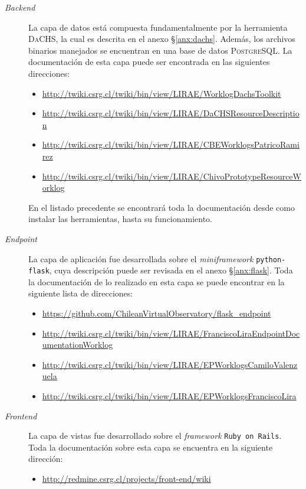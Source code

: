 \begin{description}
	\item[\emph{Backend}] La capa de datos está compuesta fundamentalmente por la herramienta \textsc{DaCHS}, la cual es descrita en el anexo \S\ref{anx:dachs}. Además, los archivos binarios manejados se encuentran en una base de datos \textsc{PostgreSQL}. La documentación de esta capa puede ser encontrada en las siguientes direcciones:
		\begin{itemize}
			\item \url{http://twiki.csrg.cl/twiki/bin/view/LIRAE/WorklogDachsToolkit}
			\item \url{http://twiki.csrg.cl/twiki/bin/view/LIRAE/DaCHSResourceDescription}
			\item \url{http://twiki.csrg.cl/twiki/bin/view/LIRAE/CBEWorklogsPatricoRamirez}
			\item \url{http://twiki.csrg.cl/twiki/bin/view/LIRAE/ChivoPrototypeResourceWorklog}
		\end{itemize}
		En el listado precedente se encontrará toda la documentación desde como instalar las herramientas, hasta su funcionamiento.
	\item[\emph{Endpoint}] La capa de aplicación fue desarrollada sobre el \emph{miniframework} \verb;python-flask;, cuya descripción puede ser revisada en el anexo \S\ref{anx:flask}. Toda la documentación de lo realizado en esta capa se puede encontrar en la siguiente lista de direcciones:
		\begin{itemize}
			\item \url{https://github.com/ChileanVirtualObservatory/flask\_endpoint}
			\item \url{http://twiki.csrg.cl/twiki/bin/view/LIRAE/FranciscoLiraEndpointDocumentationWorklog}
			\item \url{http://twiki.csrg.cl/twiki/bin/view/LIRAE/EPWorklogsCamiloValenzuela}
			\item \url{http://twiki.csrg.cl/twiki/bin/view/LIRAE/EPWorklogsFranciscoLira}
		\end{itemize}
	\item[\emph{Frontend}] La capa de vistas fue desarrollado sobre el \emph{framework} \verb;Ruby on Rails;. Toda la documentación sobre esta capa se encuentra en la siguiente dirección:
		\begin{itemize}
			\item \url{http://redmine.csrg.cl/projects/front-end/wiki}
		\end{itemize}
\end{description}

